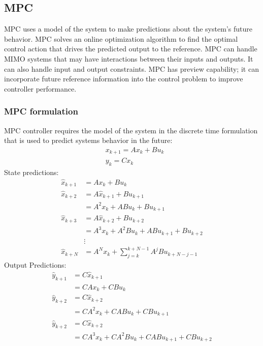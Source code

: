\subsection{MPC}
MPC uses a model of the system to make predictions about the system’s future behavior. MPC solves an online optimization algorithm to find the optimal control action that drives the predicted output to the reference. MPC can handle MIMO systems that may have interactions between their inputs and outputs. It can also handle input and output constraints. MPC has preview capability; it can incorporate future reference information into the control problem to improve controller performance.
\subsubsection{MPC formulation}
MPC controller requires the model of the system in the discrete time formulation that
is used to predict systems behavior in the future:
\begin{equation}
	\begin{split}
	&x_{k+1} = Ax_k + Bu_k\\
	&y_k = Cx_k
	\end{split}
\end{equation}
State predictions: 
\begin{equation}
\begin{split}
\hat{x}_{k+1} &= Ax_k + Bu_k\\
\hat{x}_{k+2} &= A\hat{x}_{k+1} + Bu_{k+1}\\
&= A^2x_k + ABu_k + Bu_{k+1}\\
\hat{x}_{k+3} &= A\hat{x}_{k+2} + Bu_{k+2}\\
&= A^3x_k + A^2Bu_k + ABu_{k+1} + Bu_{k+2}\\
&\vdots\\
\hat{x}_{k+N} &= A^Nx_k+\sum_{j=k}^{k+N-1}A^jBu_{k+N-j-1}
\end{split}
\end{equation}
Output Predictions:
\begin{equation}
\begin{split}
\hat{y}_{k+1} &= C\hat{x}_{k+1}\\
			  &= CAx_k + CBu_k\\
\hat{y}_{k+2} &= C\hat{x}_{k+2}\\
			  &= CA^2x_k + CABu_k + CBu_{k+1}\\
			  \hat{y}_{k+2} &= C\hat{x}_{k+2}\\
			  &= CA^3x_k + CA^2Bu_k + CABu_{k+1} + CBu_{k+2}
\end{split}
\end{equation}
